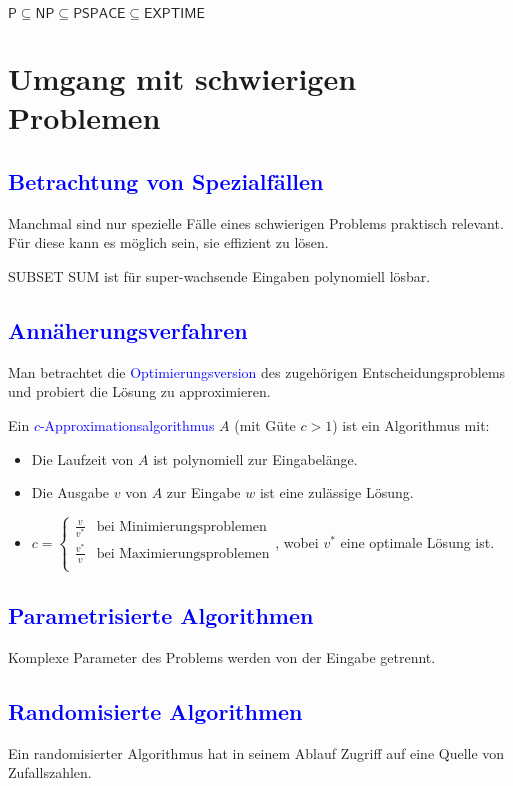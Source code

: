 \documentclass{scrreprt}
\begin{document}
\begin{Satz}
$\textsf{P}\subseteq\textsf{NP}\subseteq\textsf{PSPACE}\subseteq\textsf{EXPTIME}$
\end{Satz}

\section{Umgang mit schwierigen Problemen}
\subsection{\textcolor{blue}{Betrachtung von Spezialfällen}}
Manchmal sind nur spezielle Fälle eines schwierigen Problems praktisch relevant. Für diese kann es möglich sein, sie effizient zu lösen.
\begin{Beispiel}
\textsf{SUBSET SUM} ist für {\glqq}super-wachsende{\grqq} Eingaben polynomiell lösbar.
\end{Beispiel}
\subsection{\textcolor{blue}{Annäherungsverfahren}}
Man betrachtet die \textcolor{blue}{Optimierungsversion} des zugehörigen Entscheidungsproblems und probiert die Lösung zu approximieren.
\begin{Definition}
Ein \textcolor{blue}{$c$-Approximationsalgorithmus} $A$ (mit Güte $c > 1$) ist ein Algorithmus mit:
\begin{itemize}
\item
Die Laufzeit von $A$ ist polynomiell zur Eingabelänge.
\item
Die Ausgabe $v$ von $A$ zur Eingabe $w$ ist eine zulässige Lösung.
\item
$c=
\begin{cases}
\frac{v}{v^*}& \text{bei Minimierungsproblemen}\\
\frac{v^*}{v}& \text{bei Maximierungsproblemen}\\
\end{cases}$, wobei $v^*$ eine optimale Lösung ist.
\end{itemize}
\end{Definition}
\subsection{\textcolor{blue}{Parametrisierte Algorithmen}}
Komplexe Parameter des Problems werden von der Eingabe getrennt.

\subsection{\textcolor{blue}{Randomisierte Algorithmen}}
Ein randomisierter Algorithmus hat in seinem Ablauf Zugriff auf eine Quelle von Zufallszahlen.
\end{document}
